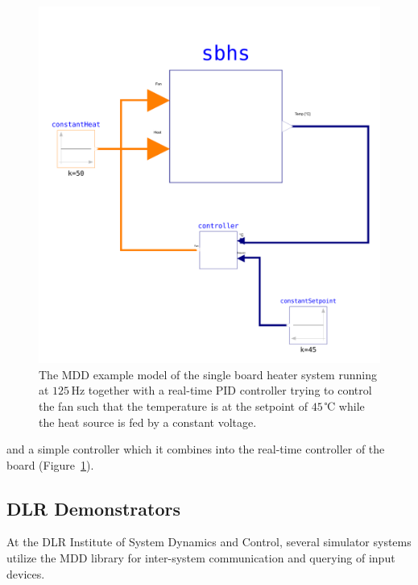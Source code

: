 \documentclass{resources/modelica}
\newcommand{\modelica}[1]{\lstinline[language=modelica]|#1|}
\newcommand{\BTHI}[1]{}
\begin{document}
\begin{figure}
  \centering
  \includegraphics[width=0.5\columnwidth]{figures/SBHSBoardWithController.pdf}
  \caption{The MDD example model of the single board heater system running at $125\,\mathrm{Hz}$ together with a real-time PID controller trying to control the fan such that the temperature is at the setpoint of $45\,$℃ while the heat source is fed by a constant voltage.}
  \label{fig:sbhswithcontroller}
\end{figure}
and a simple controller which it combines into the real-time controller of the board (Figure~\ref{fig:sbhswithcontroller}).


\subsection{DLR Demonstrators}
\BTHI{Tobias}

At the DLR Institute of System Dynamics and Control, several simulator systems
utilize the MDD library for inter-system
communication and querying of input devices.
\end{document}
